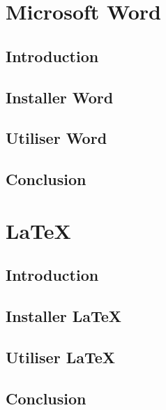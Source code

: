 \documentclass{book}
\begin{document}
	\tableofcontents
	
	\chapter{Microsoft Word} 
	
	\section*{Introduction} 
	\section{Installer Word} 
	\section{Utiliser Word} 
	\section*{Conclusion}
	
	\chapter{LaTeX} 
	\section*{Introduction} 
	\section{Installer LaTeX} 
	\section{Utiliser LaTeX} 
	\section*{Conclusion}
\end{document}
